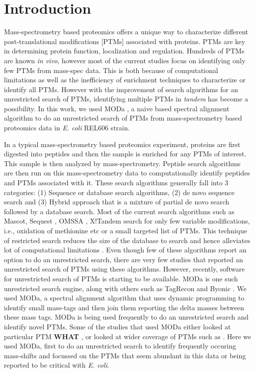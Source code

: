 \documentclass[12pt]{article}
\begin{document}

\section{Introduction}

Mass-spectrometry based proteomics \cite{Lamondetal2012} offers a unique way to characterize different post-translational modifications [PTMs] associated with proteins. PTMs are key in determining protein function, localization and regulation. Hundreds of PTMs are known \emph{in vivo}, however most of the current studies focus on identifying only few PTMs from mass-spec data. This is both because of computational limitations as well as the inefficiency of enrichment techniques to characterize or identify all PTMs. However with the improvement of search algorithms for an unrestricted search of PTMs, identifying multiple PTMs in \emph{tandem} has become a possibility. In this work, we used MODa \cite{Naetal2012}, a naive based spectral alignment algorithm to do an unrestricted search of PTMs from mass-spectrometry based proteomics data in \emph{E. coli} REL606 strain.

In a typical mass-spectrometry based proteomics experiment, proteins are first digested into peptides and then the sample is enriched for any PTMs of interest. This sample is then analyzed by mass-spectrometry. Peptide search algorithms are then run on this mass-spectrometry data to computationally identify peptides and PTMs associated with it. These search algorithms generally fall into 3 categories: (1) Sequence or database search algorithms, (2) de novo sequence search and (3) Hybrid approach that is a mixture of partial de novo search followed by a database search. Most of the current search algorithms such as Mascot\cite{Perkinsetal1999}, Sequest \cite{Engetal1994}, OMSSA \cite{Geeretal2004}, X!Tandem \cite{CraigBeavis2004} search for only few variable modifications, i.e., oxidation of methionine etc or a small targeted list of PTMs. This technique of restricted search reduces the size of the database to search and hence alleviates lot of computational limitations \cite{McHughArthur2008}. Even though few of these algorithms report an option to do an unrestricted search, there are very few studies that reported an unrestricted search of PTMs using these algorithms. However, recently, software for unrestricted search of PTMs is starting to be available. MODa \cite{Naetal2012} is one such unrestricted search engine, along with others such as TagRecon\cite{Dasarietal2010} and Byonic \cite{Bernetal2012}. We used MODa, a spectral alignment algorithm that uses dynamic programming to identify small mass-tags and then join them reporting the delta masses between these mass tags. MODa is being used frequently to do an unrestricted search and identify novel PTMs. Some of the studies that used MODa either looked at particular PTM \textbf{WHAT} \cite{Kimetal2014}, or looked at wider coverage of PTMs such as \cite{Liuetal2013}. Here we used MODa, first to do an unrestricted search to identify frequently occuring mass-shifts and focussed on the PTMs that seem abundant in this data or being reported to be critical with \emph{E. coli}. 
\end{document}

